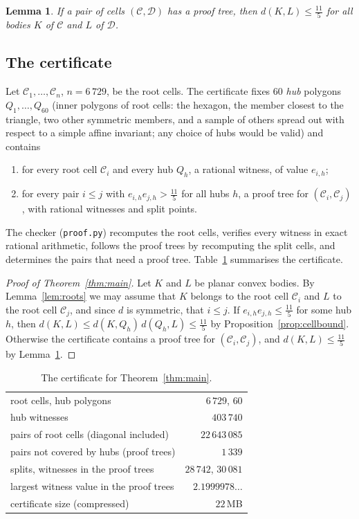 \documentclass[11pt]{amsart}
\newtheorem{lemma}[theorem]{Lemma}
\theoremstyle{definition}
\theoremstyle{remark}
\newcommand{\dBM}{d}
\newcommand{\C}{\mathcal C}
\newcommand{\D}{\mathcal D}
\begin{document}
\begin{lemma}\label{lem:tree}
If a pair of cells $(\C,\D)$ has a proof tree, then $\dBM(K,L)\le\frac{11}5$ for all bodies $K$ of $\C$ and $L$ of $\D$.
\end{lemma}

\subsection{The certificate}
Let $\C_1,\dots,\C_n$, $n=6\,729$, be the root cells. The certificate fixes $60$ \emph{hub} polygons $Q_1,\dots,Q_{60}$ (inner
polygons of root cells: the hexagon, the member closest to the triangle, two other symmetric members, and a sample of others
spread out with respect to a simple affine invariant; any choice of hubs would be valid) and contains
\begin{enumerate}
\item for every root cell $\C_i$ and every hub $Q_h$, a rational witness, of value $e_{i,h}$;
\item for every pair $i\le j$ with $e_{i,h}e_{j,h}>\frac{11}5$ for all hubs $h$, a proof tree for $(\C_i,\C_j)$, with rational
witnesses and split points.
\end{enumerate}
The checker (\texttt{proof.py}) recomputes the root cells, verifies every witness in exact rational arithmetic,
follows the proof trees by recomputing the split cells, and determines the pairs that need a proof tree. Table~\ref{tab:run}
summarises the certificate.

\begin{proof}[Proof of Theorem~\ref{thm:main}]
Let $K$ and $L$ be planar convex bodies. By Lemma~\ref{lem:roots} we may assume that $K$ belongs to the root cell $\C_i$ and
$L$ to the root cell $\C_j$, and since $\dBM$ is symmetric, that $i\le j$. If $e_{i,h}e_{j,h}\le\frac{11}5$ for some hub $h$,
then $\dBM(K,L)\le\dBM(K,Q_h)\,\dBM(Q_h,L)\le\frac{11}5$ by Proposition~\ref{prop:cellbound}. Otherwise the certificate contains a proof
tree for $(\C_i,\C_j)$, and $\dBM(K,L)\le\frac{11}5$ by Lemma~\ref{lem:tree}.
\end{proof}

\begin{table}[t]
\centering
\begin{tabular}{lr}
\toprule
root cells, hub polygons & $6\,729$, $60$\\
hub witnesses & $403\,740$\\
pairs of root cells (diagonal included) & $22\,643\,085$\\
pairs not covered by hubs (proof trees) & $1\,339$\\
splits, witnesses in the proof trees & $28\,742$, $30\,081$\\
largest witness value in the proof trees & $2.1999978\ldots$\\
certificate size (compressed) & $22$\,MB\\
\bottomrule
\end{tabular}
\caption{The certificate for Theorem~\ref{thm:main}.}
\label{tab:run}
\end{table}
\end{document}
